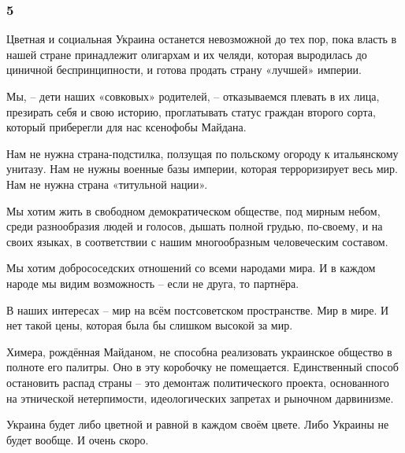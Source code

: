  
 
 
 
 

\subsubsection{5}
\label{sec:19_02_2022.fb.uljanov_anatolij.1.mne_nravitsja_kak_ih_korezhit.5}

Цветная и социальная Украина останется невозможной до тех пор, пока власть в
нашей стране принадлежит олигархам и их челяди, которая выродилась до циничной
беспринципности, и готова продать страну «лучшей» империи.

Мы, – дети наших «совковых» родителей, – отказываемся плевать в их лица,
презирать себя и свою историю, проглатывать статус граждан второго сорта,
который приберегли для нас ксенофобы Майдана.

Нам не нужна страна-подстилка, ползущая по польскому огороду к итальянскому
унитазу. Нам не нужны военные базы империи, которая терроризирует весь мир. Нам
не нужна страна «титульной нации».

Мы хотим жить в свободном демократическом обществе, под мирным небом, среди
разнообразия людей и голосов, дышать полной грудью, по-своему, и на своих
языках, в соответствии с нашим многообразным человеческим составом.

Мы хотим добрососедских отношений со всеми народами мира. И в каждом народе мы
видим возможность – если не друга, то партнёра. 

В наших интересах – мир на всём постсоветском пространстве. Мир в мире. И нет
такой цены, которая была бы слишком высокой за мир.

Химера, рождённая Майданом, не способна реализовать украинское общество в
полноте его палитры. Оно в эту коробочку не помещается. Единственный способ
остановить распад страны – это демонтаж политического проекта, основанного на
этнической нетерпимости, идеологических запретах и рыночном дарвинизме.  

Украина будет либо цветной и равной в каждом своём цвете. Либо Украины не будет
вообще. И очень скоро.


